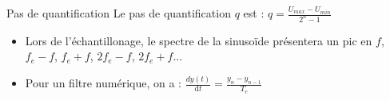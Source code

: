 \documentclass[a4paper, 11pt, french, twocolumn]{article}
\newcommand{\dt}{\mathrm{d}t}
\begin{document}
	\begin{cadre}{Pas de quantification }
		Le pas de quantification $q$ est : $q=\frac{U_{max}-U_{min}}{2^n-1}$
	\end{cadre}
	
	\begin{itemize}
		\item Lors de l'échantillonage, le spectre de la sinusoïde présentera un pic en $f$, $f_e-f$, $f_e+f$, $2f_e-f$, $2f_e+f$...
		\item Pour un filtre numérique, on a : $\frac{dy(t)}{\dt}=\frac{y_n-y_{n-1}}{T_e}$
	\end{itemize}
\end{document}
